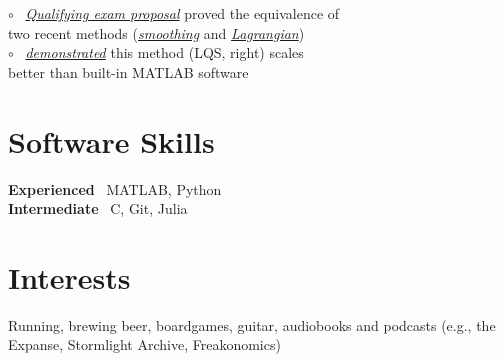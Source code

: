 \documentclass[12pt,margintitle,line]{res}
\newcommand{\CC}{C\nolinebreak\hspace{-.05em}\raisebox{.4ex}{\scriptsize\bf +}\nolinebreak\hspace{-.10em}\raisebox{.4ex}{\scriptsize\bf +} }
\def\CC{{C\nolinebreak[4]\hspace{-.05em}\raisebox{.4ex}{\scriptsize\bf ++}}}
\begin{document}
\begin{resume}
\begin{position}
\vspace{-1.25cm}
$\circ$ \ 
\href{https://github.com/Will-Wright/lasso-quadratic-solver/blob/master/will_wright_qualifying_exam_proposal.pdf}{\textit{Qualifying exam proposal}} 
proved the equivalence of 
	\\ 	\hspace*{0.35cm} 
two recent methods 
(\href{https://link.springer.com/article/10.1007/s10589-017-9912-y}{\textit{smoothing}} 
and
\href{https://academic.oup.com/imajna/article/37/4/1635/3059683}{\textit{Lagrangian}})
	\\
$\circ$ \ \href{https://github.com/Will-Wright/lasso-quadratic-solver#demo-tutorial}{\textit{demonstrated}} 
this method (LQS, right) scales
	\\		\hspace*{0.35cm} 
better than built-in MATLAB software
\end{position}






\vspace{-0.2cm}

\section{Software Skills}

\title{}
\employer{}
\dates{}
\begin{position}

\vspace{-2.4cm}
\textbf{Experienced}  \ MATLAB, Python
	\\
\textbf{Intermediate} \ \CC, Git, Julia
\end{position}


\section{Interests}

\vspace{-1.0cm}
\title{}
\employer{}
\dates{}
\begin{position}
Running, brewing beer, boardgames, guitar, audiobooks and podcasts (e.g., the Expanse, Stormlight Archive, Freakonomics)
\end{position}


\end{resume}
\end{document}
